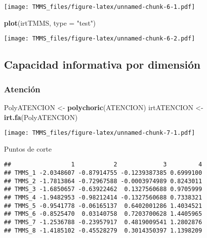 \documentclass[
  10pt,
  spanish,
]{article}
\newenvironment{Shaded}{\begin{snugshade}}{\end{snugshade}}
\newcommand{\DataTypeTok}[1]{\textcolor[rgb]{0.13,0.29,0.53}{#1}}
\newcommand{\KeywordTok}[1]{\textcolor[rgb]{0.13,0.29,0.53}{\textbf{#1}}}
\newcommand{\NormalTok}[1]{#1}
\newcommand{\OperatorTok}[1]{\textcolor[rgb]{0.81,0.36,0.00}{\textbf{#1}}}
\newcommand{\StringTok}[1]{\textcolor[rgb]{0.31,0.60,0.02}{#1}}
\begin{document}
\texttt{[image: TMMS\_files/figure-latex/unnamed-chunk-6-1.pdf]}

\begin{Shaded}
\begin{Highlighting}[]
\KeywordTok{plot}\NormalTok{(irtTMMS, }\DataTypeTok{type =} \StringTok{"test"}\NormalTok{)}
\end{Highlighting}
\end{Shaded}

\texttt{[image: TMMS\_files/figure-latex/unnamed-chunk-6-2.pdf]}

\hypertarget{capacidad-informativa-por-dimensiuxf3n}{%
\subsection{Capacidad informativa por
dimensión}\label{capacidad-informativa-por-dimensiuxf3n}}

\hypertarget{atenciuxf3n}{%
\subsubsection{Atención}\label{atenciuxf3n}}

\begin{Shaded}
\begin{Highlighting}[]
\NormalTok{PolyATENCION <-}\StringTok{ }\KeywordTok{polychoric}\NormalTok{(ATENCION)}
\NormalTok{irtATENCION <-}\StringTok{ }\KeywordTok{irt.fa}\NormalTok{(PolyATENCION)}
\end{Highlighting}
\end{Shaded}

\texttt{[image: TMMS\_files/figure-latex/unnamed-chunk-7-1.pdf]}

Puntos de corte

\begin{Shaded}
\end{Shaded}

\begin{verbatim}
##                 1           2             3         4
## TMMS_1 -2.0348607 -0.87914755 -0.1239387385 0.6999100
## TMMS_2 -1.7813864 -0.72967588 -0.0003974989 0.8243011
## TMMS_3 -1.6850657 -0.63922462  0.1327560688 0.9705999
## TMMS_4 -1.9482953 -0.98212414 -0.1327560688 0.7338321
## TMMS_5 -0.9541778 -0.06165137  0.6402001286 1.4034521
## TMMS_6 -0.8525470  0.03140758  0.7203700628 1.4405965
## TMMS_7 -1.2536788 -0.23957917  0.4819009541 1.2802876
## TMMS_8 -1.4185102 -0.45528279  0.3014350397 1.1398209
\end{verbatim}
\end{document}
